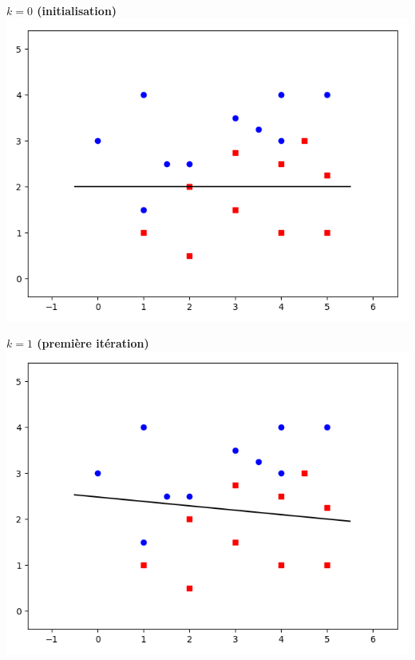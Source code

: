 \begin{exemple}{}{}
\begin{itemize}
		\begin{center}
			\begin{minipage}{0.45\textwidth}
				\center \textbf{$k=0$ (initialisation)} 
				\includegraphics[scale=\myscale,scale=0.4]{figures/retro_01_b}
			\end{minipage}
			\begin{minipage}{0.45\textwidth}
				\center \textbf{$k=1$ (première itération)}
				\includegraphics[scale=\myscale,scale=0.4]{figures/retro_01_c}
			\end{minipage}
			

\end{center}
\end{itemize}
\end{exemple}
